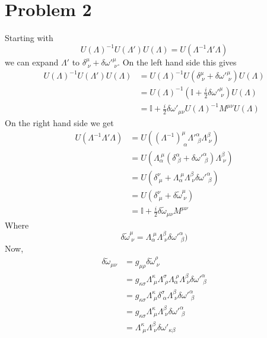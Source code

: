 \documentclass[12pt]{article}
\begin{document}
\section*{Problem 2}
Starting with
\[ U(\Lambda)^{-1}U(\Lambda')U(\Lambda) = U(\Lambda^{-1}\Lambda'\Lambda) \]
we can expand $\Lambda'$ to $\delta_{\;\nu}^{\mu} + \delta{\omega'}_{\;\nu}^{\mu}$. On the left hand side this gives
\begin{align*}
    U(\Lambda)^{-1}U(\Lambda')U(\Lambda) &= U(\Lambda)^{-1}U(\delta_{\;\nu}^{\mu} + \delta{\omega'}_{\;\nu}^{\mu})U(\Lambda) \\
    &= U(\Lambda)^{-1}\left(\mathbb{I} + \frac{i}{2}\delta{\omega'}_{\;\nu}^\mu\right)U(\Lambda) \\
    &= \mathbb{I} + \frac{i}{2}\delta{\omega'}_{\mu\nu}U(\Lambda)^{-1}M^{\mu\nu}U(\Lambda)
\end{align*}
On the right hand side we get
\begin{align*}
    U(\Lambda^{-1}\Lambda'\Lambda) &= U((\Lambda^{-1})_{\;\alpha}^{\mu}{\Lambda'}_{\;\beta}^{\alpha}\Lambda_{\;\nu}^{\beta}) \\
    &= U(\Lambda_{\alpha}^{\;\mu}(\delta_{\;\beta}^\alpha + \delta{\omega'}_{\;\beta}^\alpha)\Lambda_{\;\nu}^{\beta}) \\
    &= U(\delta_{\;\mu}^\nu + \Lambda_\alpha^{\;\mu}\Lambda_{\;\nu}^\beta\delta{\omega'}_{\;\beta}^\alpha) \\
    &= U(\delta_{\;\mu}^\nu + \delta\tilde{\omega}_{\;\nu}^\mu) \\
    &= \mathbb{I} + \frac{i}{2}\delta\tilde{\omega}_{\mu\nu}M^{\mu\nu}
\end{align*}
Where
\[ \delta\tilde{\omega}_{\;\nu}^\mu = \Lambda_\alpha^{\;\mu}\Lambda_{\;\nu}^\beta\delta{\omega'}_{\;\beta}^\alpha) \]
Now,
\begin{align*}
    \delta\tilde{\omega}_{\mu\nu} &= g_{\mu\rho}\delta\tilde{\omega}_{\;\nu}^\rho \\
    &= g_{\kappa\sigma}\Lambda_{\;\mu}^{\kappa}\Lambda_{\;\rho}^\sigma\Lambda_\alpha^{\;\rho}\Lambda_{\;\nu}^\beta\delta{\omega'}_{\;\beta}^\alpha \\
    &= g_{\kappa\sigma}\Lambda_{\;\mu}^{\kappa}\delta_{\;\alpha}^\sigma\Lambda_{\;\nu}^\beta\delta{\omega'}_{\;\beta}^\alpha \\
    &= g_{\kappa\sigma}\Lambda_{\;\mu}^\kappa\Lambda_{\;\nu}^\beta\delta{\omega'}_{\;\beta}^\alpha \\
    &= \Lambda_{\;\mu}^\kappa\Lambda_{\;\nu}^\beta\delta{\omega'}_{\kappa\beta}
\end{align*}
\end{document}
